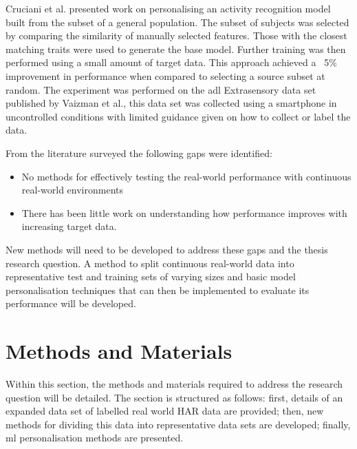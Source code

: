 Cruciani et al. presented work on personalising an activity recognition model built from the subset of a general population. The subset of subjects was selected by comparing the similarity of manually selected features. Those with the closest matching traits were used to generate the base model. Further training was then performed using a small amount of target data. This approach achieved a ~5\% improvement in performance when compared to selecting a source subset at random\cite{Cruciani2020}. The experiment was performed on the \acrshort{adl} Extrasensory data set published by Vaizman et al.\cite{Vaizman2017}, this data set was collected using a smartphone in uncontrolled conditions with limited guidance given on how to collect or label the data.

From the literature surveyed the following gaps were identified:
\begin{itemize}
\item No methods for effectively testing the real-world performance with continuous real-world environments
\item There has been little work on understanding how performance improves with increasing target data.
\end{itemize}

New methods will need to be developed to address these gaps and the thesis research question. A method to split continuous real-world data into representative test and training sets of varying sizes and basic model personalisation techniques that can then be implemented to evaluate its performance will be developed.

\section{Methods and Materials}
\label{sec:personalistaion-methods}
Within this section, the methods and materials required to address the research question will be detailed. The section is structured as follows: first, details of an expanded data set of labelled real world HAR data are provided; then, new methods for dividing this data into representative data sets are developed; finally, \acrshort{ml} personalisation methods are presented.


